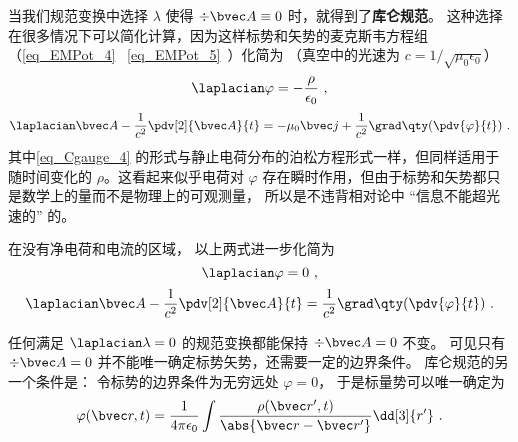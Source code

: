 

当我们规范变换中选择 $\lambda$ 使得 $\div \bvec A \equiv 0$ 时，就得到了\textbf{库仑规范}。 这种选择在很多情况下可以简化计算，因为这样标势和矢势的麦克斯韦方程组（\autoref{eq_EMPot_4}~ \autoref{eq_EMPot_5}~）化简为 （真空中的光速为 $c = 1/\sqrt{\mu_0\epsilon_0}$）%
\begin{equation}\label{eq_Cgauge_4}
\laplacian \varphi = -\frac{\rho}{\epsilon_0}~,
\end{equation}
\begin{equation}\label{eq_Cgauge_3}
\laplacian \bvec A - \frac{1}{c^2} \pdv[2]{\bvec A}{t} = -\mu_0\bvec j + \frac{1}{c^2} \grad\qty(\pdv{\varphi}{t})~.
\end{equation}
其中\autoref{eq_Cgauge_4} 的形式与静止电荷分布的泊松方程形式一样，但同样适用于随时间变化的 $\rho$。这看起来似乎电荷对 $\varphi$ 存在瞬时作用，但由于标势和矢势都只是数学上的量而不是物理上的可观测量， 所以是不违背相对论中 “信息不能超光速的” 的。

在没有净电荷和电流的区域， 以上两式进一步化简为
\begin{equation}
\laplacian \varphi = 0~,
\end{equation}
\begin{equation}
\laplacian \bvec A - \frac{1}{c^2}\pdv[2]{\bvec A}{t} = \frac{1}{c^2} \grad\qty(\pdv{\varphi}{t})~.
\end{equation}

任何满足 $\laplacian \lambda = 0$ 的规范变换都能保持 $\div \bvec A = 0$ 不变。 可见只有 $\div \bvec A = 0$ 并不能唯一确定标势矢势，还需要一定的边界条件。 库仑规范的另一个条件是： 令标势的边界条件为无穷远处 $\varphi = 0$， 于是标量势可以唯一确定为
\begin{equation}\label{eq_Cgauge_1}
\varphi(\bvec r, t) = \frac{1}{4\pi\epsilon_0} \int \frac{\rho(\bvec r', t)}{\abs{\bvec r - \bvec r'}} \dd[3]{r'}~.
\end{equation}

